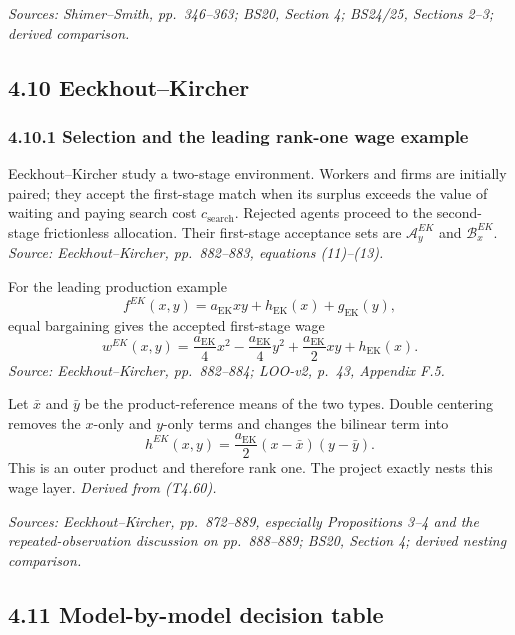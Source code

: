 \documentclass[11pt]{article}
\begin{document}
\textit{Sources: Shimer--Smith, pp.\ 346--363; BS20, Section 4; BS24/25,
Sections 2--3; derived comparison.}

\subsection{4.10 Eeckhout--Kircher}

\subsubsection{4.10.1 Selection and the leading rank-one wage example}

Eeckhout--Kircher study a two-stage environment.  Workers and firms are
initially paired; they accept the first-stage match when its surplus exceeds
the value of waiting and paying search cost \(c_{\mathrm{search}}\).  Rejected
agents proceed to the second-stage frictionless allocation.  Their first-stage
acceptance sets are \(\mathcal A_y^{EK}\) and
\(\mathcal B_x^{EK}\).
\textit{Source: Eeckhout--Kircher, pp.\ 882--883, equations (11)--(13).}

For the leading production example
\[
f^{EK}(x,y)
=
a_{\mathrm{EK}}xy
+h_{\mathrm{EK}}(x)
+g_{\mathrm{EK}}(y),
\tag{T4.59}
\]
equal bargaining gives the accepted first-stage wage
\[
w^{EK}(x,y)
=
\frac{a_{\mathrm{EK}}}{4}x^2
-\frac{a_{\mathrm{EK}}}{4}y^2
+\frac{a_{\mathrm{EK}}}{2}xy
+h_{\mathrm{EK}}(x).
\tag{T4.60}
\]
\textit{Source: Eeckhout--Kircher, pp.\ 882--884; LOO-v2, p.\ 43,
Appendix F.5.}

Let \(\bar x\) and \(\bar y\) be the product-reference means of the two types.
Double centering removes the \(x\)-only and \(y\)-only terms and changes the
bilinear term into
\[
h^{EK}(x,y)
=
\frac{a_{\mathrm{EK}}}{2}
(x-\bar x)(y-\bar y).
\tag{T4.61}
\]
This is an outer product and therefore rank one.  The project exactly nests
this wage layer.
\textit{Derived from (T4.60).}

\textit{Sources: Eeckhout--Kircher, pp.\ 872--889, especially Propositions
3--4 and the repeated-observation discussion on pp.\ 888--889; BS20,
Section 4; derived nesting comparison.}

\subsection{4.11 Model-by-model decision table}
\end{document}
